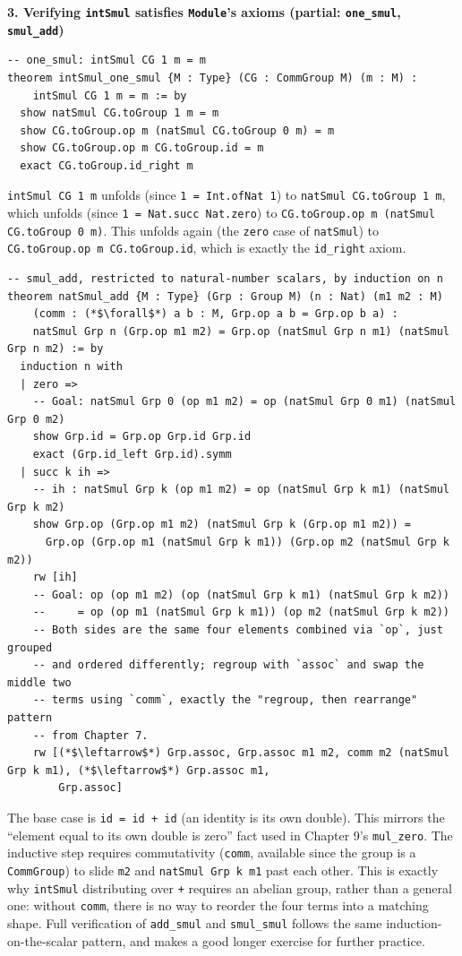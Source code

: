 \textbf{3. Verifying \texttt{intSmul} satisfies \texttt{Module}'s axioms (partial: \texttt{one\_\allowbreak{}smul}, \texttt{smul\_\allowbreak{}add})}

\begin{lstlisting}
-- one_smul: intSmul CG 1 m = m
theorem intSmul_one_smul {M : Type} (CG : CommGroup M) (m : M) :
    intSmul CG 1 m = m := by
  show natSmul CG.toGroup 1 m = m
  show CG.toGroup.op m (natSmul CG.toGroup 0 m) = m
  show CG.toGroup.op m CG.toGroup.id = m
  exact CG.toGroup.id_right m
\end{lstlisting}

\texttt{intSmul CG 1 m} unfolds (since \texttt{1 = Int.ofNat 1}) to \texttt{natSmul CG.toGroup 1 m}, which unfolds (since \texttt{1 = Nat.succ Nat.zero}) to \texttt{CG.toGroup.op m (natSmul CG.toGroup 0 m)}. This unfolds again (the \texttt{zero} case of \texttt{natSmul}) to \texttt{CG.toGroup.op m CG.toGroup.id}, which is exactly the \texttt{id\_\allowbreak{}right} axiom.

\begin{lstlisting}
-- smul_add, restricted to natural-number scalars, by induction on n
theorem natSmul_add {M : Type} (Grp : Group M) (n : Nat) (m1 m2 : M)
    (comm : (*$\forall$*) a b : M, Grp.op a b = Grp.op b a) :
    natSmul Grp n (Grp.op m1 m2) = Grp.op (natSmul Grp n m1) (natSmul Grp n m2) := by
  induction n with
  | zero =>
    -- Goal: natSmul Grp 0 (op m1 m2) = op (natSmul Grp 0 m1) (natSmul Grp 0 m2)
    show Grp.id = Grp.op Grp.id Grp.id
    exact (Grp.id_left Grp.id).symm
  | succ k ih =>
    -- ih : natSmul Grp k (op m1 m2) = op (natSmul Grp k m1) (natSmul Grp k m2)
    show Grp.op (Grp.op m1 m2) (natSmul Grp k (Grp.op m1 m2)) =
      Grp.op (Grp.op m1 (natSmul Grp k m1)) (Grp.op m2 (natSmul Grp k m2))
    rw [ih]
    -- Goal: op (op m1 m2) (op (natSmul Grp k m1) (natSmul Grp k m2))
    --     = op (op m1 (natSmul Grp k m1)) (op m2 (natSmul Grp k m2))
    -- Both sides are the same four elements combined via `op`, just grouped
    -- and ordered differently; regroup with `assoc` and swap the middle two
    -- terms using `comm`, exactly the "regroup, then rearrange" pattern
    -- from Chapter 7.
    rw [(*$\leftarrow$*) Grp.assoc, Grp.assoc m1 m2, comm m2 (natSmul Grp k m1), (*$\leftarrow$*) Grp.assoc m1,
        Grp.assoc]
\end{lstlisting}

The base case is \texttt{id = id + id} (an identity is its own double). This mirrors the ``element equal to its own double is zero'' fact used in Chapter 9's \texttt{mul\_\allowbreak{}zero}. The inductive step requires commutativity (\texttt{comm}, available since the group is a \texttt{CommGroup}) to slide \texttt{m2} and \texttt{natSmul Grp k m1} past each other. This is exactly why \texttt{intSmul} distributing over \texttt{+} requires an abelian group, rather than a general one: without \texttt{comm}, there is no way to reorder the four terms into a matching shape. Full verification of \texttt{add\_\allowbreak{}smul} and \texttt{smul\_\allowbreak{}smul} follows the same induction-on-the-scalar pattern, and makes a good longer exercise for further practice.

